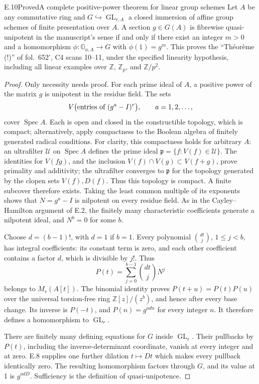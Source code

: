 \begin{statement}{E.10}{Proved}{A complete positive-power theorem for linear group schemes}
Let \(A\) be any commutative ring and
\(G\hookrightarrow\operatorname{GL}_{r,A}\) a closed immersion of
affine group schemes of finite presentation over \(A\).  A section
\(g\in G(A)\) is fibrewise quasi-unipotent in the manuscript's sense
if and only if there exist an integer \(m>0\) and a homomorphism
\(\phi:\mathbb G_{a,A}\to G\) with \(\phi(1)=g^m\).
This proves the ``Th\'eor\`eme (!)'' of fol.~652', C4 scans 10--11,
under the specified linearity hypothesis, including all linear
examples over \(\mathbb Z\), \(\mathbb Z_p\), and \(\mathbb Z/p^2\).
\end{statement}
\begin{proof}
Only necessity needs proof.  For each prime ideal of \(A\), a
positive power of the matrix \(g\) is unipotent in the residue
field.  The sets
\[
 V\bigl(\hbox{entries of }(g^a-I)^r\bigr),\qquad a=1,2,\ldots,
\]
cover \(\operatorname{Spec}A\).  Each is open and closed in the
constructible topology, which is compact; alternatively, apply
compactness to the Boolean algebra of finitely generated radical
conditions.  For clarity, this compactness holds for arbitrary
\(A\): an ultrafilter \(\mathcal U\) on \(\operatorname{Spec}A\)
defines the prime ideal
\(\mathfrak p=\{f:V(f)\in\mathcal U\}\).
The identities for \(V(fg)\), and the inclusion
\(V(f)\cap V(g)\subset V(f+g)\), prove primality and additivity;
the ultrafilter converges to \(\mathfrak p\) for the topology
generated by the clopen sets \(V(f),D(f)\).  Thus this topology
is compact.  A finite subcover therefore exists.  Taking the least
common multiple of its exponents shows that \(N=g^a-I\) is
nilpotent on every residue field.  As in the Cayley--Hamilton
argument of E.2, the finitely many characteristic coefficients
generate a nilpotent ideal, and \(N^b=0\) for some \(b\).

Choose \(d=(b-1)!\), with \(d=1\) if \(b=1\).  Every polynomial
\(\binom{dt}j\), \(1\leq j<b\), has integral coefficients: its
constant term is zero, and each other coefficient contains a
factor \(d\), which is divisible by \(j!\).  Thus
\[
                   P(t)=\sum_{j=0}^{b-1}\binom{dt}jN^j
\]
belongs to \(M_r(A[t])\).  The binomial identity proves
\(P(t+u)=P(t)P(u)\) over the universal torsion-free ring
\(\mathbb Z[z]/(z^b)\), and hence after every base change.
Its inverse is \(P(-t)\), and \(P(n)=g^{adn}\) for every integer
\(n\).  It therefore defines a homomorphism to \(\operatorname{GL}_r\).

There are finitely many defining equations for \(G\) inside
\(\operatorname{GL}_r\).  Their pullbacks by \(P(t)\), including
the inverse-determinant coordinate, vanish at every integer and
at zero.  E.8 supplies one further dilation \(t\mapsto Dt\)
which makes every pullback identically zero.  The resulting
homomorphism factors through \(G\), and its value at 1 is
\(g^{adD}\).  Sufficiency is the definition of quasi-unipotence.
\end{proof}

